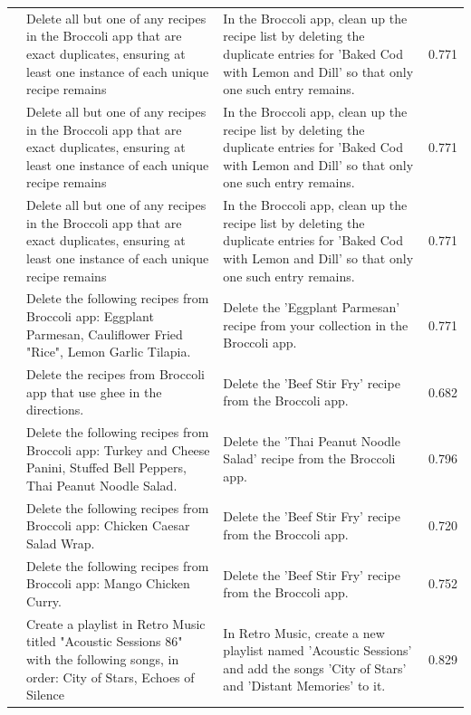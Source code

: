 \documentclass{article} %
\begin{document}
\begin{scriptsize}
\begin{longtable}{@{} c >{\raggedright\arraybackslash}p{} >{\raggedright\arraybackslash}p{} c @{}}
\addlinespace[2pt]
51 & Delete all but one of any recipes in the Broccoli app that are exact duplicates, ensuring at least one instance of each unique recipe remains & In the Broccoli app, clean up the recipe list by deleting the duplicate entries for 'Baked Cod with Lemon and Dill' so that only one such entry remains. & 0.771 \\
\addlinespace[2pt]
52 & Delete all but one of any recipes in the Broccoli app that are exact duplicates, ensuring at least one instance of each unique recipe remains & In the Broccoli app, clean up the recipe list by deleting the duplicate entries for 'Baked Cod with Lemon and Dill' so that only one such entry remains. & 0.771 \\
\addlinespace[2pt]
53 & Delete all but one of any recipes in the Broccoli app that are exact duplicates, ensuring at least one instance of each unique recipe remains & In the Broccoli app, clean up the recipe list by deleting the duplicate entries for 'Baked Cod with Lemon and Dill' so that only one such entry remains. & 0.771 \\
\addlinespace[2pt]
54 & Delete the following recipes from Broccoli app: Eggplant Parmesan, Cauliflower Fried "Rice", Lemon Garlic Tilapia. & Delete the 'Eggplant Parmesan' recipe from your collection in the Broccoli app. & 0.771 \\
\addlinespace[2pt]
55 & Delete the recipes from Broccoli app that use ghee in the directions. & Delete the 'Beef Stir Fry' recipe from the Broccoli app. & 0.682 \\
\addlinespace[2pt]
56 & Delete the following recipes from Broccoli app: Turkey and Cheese Panini, Stuffed Bell Peppers, Thai Peanut Noodle Salad. & Delete the 'Thai Peanut Noodle Salad' recipe from the Broccoli app. & 0.796 \\
\addlinespace[2pt]
57 & Delete the following recipes from Broccoli app: Chicken Caesar Salad Wrap. & Delete the 'Beef Stir Fry' recipe from the Broccoli app. & 0.720 \\
\addlinespace[2pt]
58 & Delete the following recipes from Broccoli app: Mango Chicken Curry. & Delete the 'Beef Stir Fry' recipe from the Broccoli app. & 0.752 \\
\addlinespace[2pt]
59 & Create a playlist in Retro Music titled "Acoustic Sessions 86" with the following songs, in order: City of Stars, Echoes of Silence & In Retro Music, create a new playlist named 'Acoustic Sessions' and add the songs 'City of Stars' and 'Distant Memories' to it. & 0.829 \\

\end{longtable}
\end{scriptsize}
\end{document}
